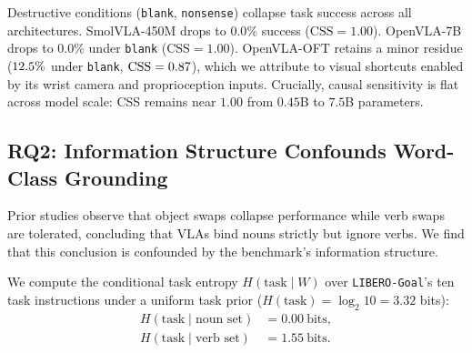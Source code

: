 \documentclass[11pt]{article}
\begin{document}
\begin{table}[t]
\centering
\small
\resizebox{\ifdim\width>\linewidth\linewidth\else\width\fi}{!}{}
\caption{\textbf{Task Success Rate (TSR) and Causal Sensitivity Score (CSS) across Model Scales.} Comprehensive evaluation of SmolVLA-450M, OpenVLA-7B, and OpenVLA-OFT-7.5B under structural and semantic instruction perturbations on \texttt{LIBERO-Goal}. Columns evaluate: \textbf{Baseline} ($I_{\text{orig}}$), \textbf{Blank} (empty prompt), \textbf{Nonsense} (out-of-domain tokens), \textbf{Wrong Action} (verb swap), \textbf{Wrong Object} (noun swap), \textbf{Wrong Task} (full instruction swap to an alternate task in scene $S_0$), and \textbf{Repeated} (length control). Causal Sensitivity Scores ($\text{CSS} \in [0, 1]$) in parentheses demonstrate that language is causally load-bearing and scale-invariant across a $16\times$ parameter range. \rqOneNNote\ \sceneNote}
\label{tab:rq1_causal}
\end{table}

Destructive conditions (\texttt{blank}, \texttt{nonsense}) collapse task success across all architectures. SmolVLA-450M drops to $0.0\%$ success ($\text{CSS}=1.00$). OpenVLA-7B drops to $0.0\%$ under \texttt{blank} ($\text{CSS}=1.00$). OpenVLA-OFT retains a minor residue ($12.5\%$ under \texttt{blank}, $\text{CSS}=0.87$), which we attribute to visual shortcuts enabled by its wrist camera and proprioception inputs. Crucially, causal sensitivity is flat across model scale: CSS remains near $1.00$ from $0.45$B to $7.5$B parameters.


\subsection{RQ2: Information Structure Confounds Word-Class Grounding}
\label{sec:info}
Prior studies observe that object swaps collapse performance while verb swaps are tolerated, concluding that VLAs bind nouns strictly but ignore verbs. We find that this conclusion is confounded by the benchmark's information structure.

We compute the conditional task entropy $H(\text{task}\mid W)$ over \texttt{LIBERO-Goal}'s ten task instructions under a uniform task prior ($H(\text{task}) = \log_2 10 = 3.32$ bits):
\begin{equation}
\begin{aligned}
H(\text{task}\mid\text{noun set}) &= 0.00\ \text{bits},\\
H(\text{task}\mid\text{verb set}) &= 1.55\ \text{bits}.
\end{aligned}
\end{equation}
\end{document}
